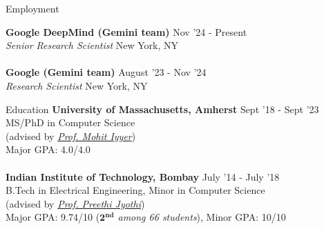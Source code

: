 \documentclass{resume} %
\begin{document}

\begin{rSection}{Employment}
\vspace*{0.1in}

{\bf Google DeepMind (Gemini team)} { \hfill Nov '24 - Present}\\ \textit{Senior Research Scientist} {\hfill New York, NY}\\\\
{\bf Google (Gemini team)} { \hfill August '23 - Nov '24}\\ \textit{Research Scientist} {\hfill New York, NY}

\end{rSection}

\begin{rSection}{Education}
\vspace*{0.1in}
{\bf University of Massachusetts, Amherst} \hfill {Sept '18 - Sept '23} \\ MS/PhD in Computer Science \\ (advised by \textit{\href{https://people.cs.umass.edu/~miyyer/}{Prof. Mohit Iyyer}}) \\
Major GPA: 4.0/4.0\\\\
{\bf Indian Institute of Technology, Bombay} \hfill {July '14 - July '18} \\ 
B.Tech in Electrical Engineering, Minor in Computer Science\\
(advised by \textit{\href{https://www.cse.iitb.ac.in/~pjyothi/}{Prof. Preethi Jyothi}})\\
Major GPA: 9.74/10 (\textit{$\mathbf{2^{nd}}$ among 66 students}), Minor GPA: 10/10
\end{rSection}
\end{document}
